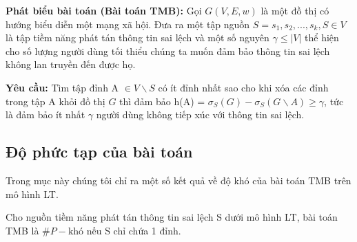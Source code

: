 \textbf{Phát biểu bài toán (Bài toán TMB):} Gọi $G(V,E,w)$ là một đồ thị có hướng biểu diễn một mạng xã hội. Đưa ra một tập nguồn $S = {s_{1}, s_{2}, ... , s_{k}}, S \in V$ là tập tiềm năng phát tán thông tin sai lệch và một số nguyên $\gamma \leq | V |$ thể hiện cho số lượng người dùng tối thiểu chúng ta muốn đảm bảo thông tin sai lệch không lan truyền đến được họ.

\textbf{Yêu cầu:} Tìm tập đỉnh A $\in V \backslash S$ có ít đỉnh nhất sao cho khi xóa các đỉnh trong tập A khỏi đồ thị $G$ thì đảm bảo h(A) = $\sigma_{S}(G) - \sigma_{S}(G \backslash A) \geq \gamma$, tức là đảm bảo ít nhất $\gamma$ người dùng không tiếp xúc với thông tin sai lệch.
\subsection{Độ phức tạp của bài toán}		
Trong mục này chúng tôi chỉ ra một số kết quả về độ khó của bài toán TMB trên mô hình LT.
\begin{theo}
	Cho nguồn tiềm năng phát tán thông tin sai lệch S dưới mô hình LT, bài toán TMB là $\#P-\text{khó}$ nếu S chỉ chứa 1 đỉnh.
\end{theo}
